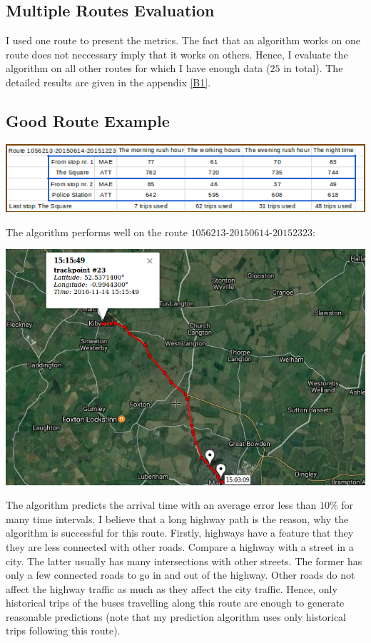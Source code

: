 \documentclass[12pt,a4paper,oneside,openright]{report}
\begin{document}
\subsection{Multiple Routes Evaluation}

I used one route to present the metrics. The fact that an algorithm works on one route
does not neccessary imply that it works on others. Hence, I evaluate the algorithm on
all other routes for which I have enough data ($25$ in total). The
detailed results are given in the appendix \ref{B1}. \\

\subsection*{Good Route Example}

\includegraphics[width=\textwidth]{figs/table_of_1056213.png}

The algorithm performs well on the route $1056213$-$20150614$-$20152323$:

\includegraphics[scale=0.65]{figs/best_route.png}

The algorithm predicts the arrival time with an average error less than $10\%$ for
many time intervals. I believe that a long highway path is the reason, why the algorithm
is successful for this route. Firstly, highways have a feature that they they are less
connected with other roads. Compare a highway with a street in a city. The latter usually has many
intersections with other streets. The former has only a few connected roads to go in and out
of the highway. Other roads do not affect the highway traffic as much as they affect the city traffic.
Hence, only historical trips of the buses travelling along this route are enough to generate
reasonable predictions (note that my prediction algorithm uses only historical trips
following this route). \\ 
\end{document}
